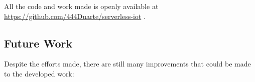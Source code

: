 All the code and work made is openly available at \url{https://github.com/444Duarte/serverless-iot} .








\subsection{Future Work}
Despite the efforts made, there are still many improvements that could be made to
the developed work:

